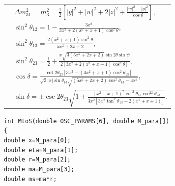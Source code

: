 \documentclass[a4paper,11pt]{article}
\begin{document}
\begin{table}[h!]
\begin{tabular}{l|l}
                                                 & $\Delta m_{31}^2=m^2_3=\frac{1}{2}\left[\left|y\right|^2+\left|w\right|^2+2\left|z\right|^2+\frac{\left|w\right|^2-\left|y\right|^2}{\cos\theta}\right]$,                                        \\
                                                 & $\sin^2\theta_{12}=1-\frac{3x^2 }{3x^2+2\left(x^2+x+1\right) \cos^2\theta }$,                                                                                                                  \\
                                                                                                  & $\sin^2\theta_{13}=\frac{2\left(x^2+x+1\right)\sin^2\theta}{5x^2+2x+2}$,                                                                                                                       \\
                                                 & $\sin^2\theta_{23}=\frac{1}{2}+\frac{x\sqrt{3\left(5x^2+2x+2\right)}\sin2\theta\sin\psi }{2\left[3x^2+2\left(x^2+x+1\right) \cos^ 2 \theta\right]}$,                                          \\
                                                 & $\cos\delta=\frac{ \cot 2 \theta_{23} \left[3x^2-\left(4x^2+ x+1\right)\cos^2\theta_{13}\right]}{\sqrt{3} \left|x\right| \sin \theta_{13} \sqrt{\left(5x^2+2x+2\right)\cos^2\theta_{13}-3x^2}}$, \\
                                                 & $\sin\delta= \pm\csc 2 \theta_{23} \sqrt{1+\frac{\left(x^2+x+1\right)^2 \cot ^2\theta_{13} \cos ^22 \theta_{23}}{3x^2 \left[3x^2 \tan ^2\theta_{13}-2 \left(x^2+x+1\right)\right]}}$.   \\\hline \hline       
\end{tabular}
\end{table}




\texttt{int MtoS(double OSC\_PARAMS[6],~double M\_para[])}\\
\texttt{\{}
\\        
   \texttt{double x=M\_para[0];}\\
    \texttt{double eta=M\_para[1];}\\
    \texttt{double r=M\_para[2];}\\
    \texttt{double ma=M\_para[3];}\\
    \texttt{double ms=ma*r;}\\
    
\end{document}
